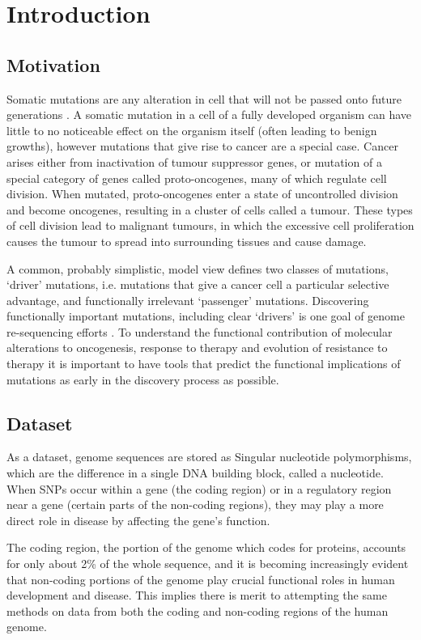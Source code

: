 \section{Introduction}

\subsection{Motivation}
Somatic mutations are any alteration in cell that will not be passed onto future generations \cite{Griffiths2000}. A somatic mutation in a cell of a fully developed organism can have little to no noticeable effect on the organism itself (often leading to benign growths), however mutations that give rise to cancer are a special case. Cancer arises either from inactivation of tumour suppressor genes, or mutation of a special category of genes called proto-oncogenes, many of which regulate cell division. When mutated, proto-oncogenes enter a state of uncontrolled division and become oncogenes, resulting in a cluster of cells called a tumour.  
These types of cell division lead to malignant tumours, in which the excessive cell proliferation causes the tumour to spread into surrounding tissues and cause damage. 

A common, probably simplistic, model view defines two classes of mutations, `driver' mutations, i.e. mutations that give a cancer cell a particular selective advantage, and functionally irrelevant `passenger' mutations.
Discovering functionally important mutations, including clear ‘drivers’ is one goal of genome re-sequencing efforts \cite{Reva2011}. To understand the functional contribution of molecular alterations to oncogenesis, response to therapy and evolution of resistance to therapy it is important to have tools that predict the functional implications of mutations as early in the discovery process as possible.


\subsection{Dataset}
As a dataset, genome sequences are stored as Singular nucleotide polymorphisms, which are the difference in a single DNA building block, called a nucleotide. When SNPs occur within a gene (the coding region) or in a regulatory region near a gene (certain parts of the non-coding regions), they may play a more direct role in disease by affecting the gene’s function.

The coding region, the portion of the genome which codes for proteins, accounts for only about 2\% of the whole sequence, and it is becoming increasingly evident that non-coding portions of the genome play crucial functional roles in human development and disease\cite{Esteller2011}. This implies there is merit to attempting the same methods on data from both the coding and non-coding regions of the human genome.

